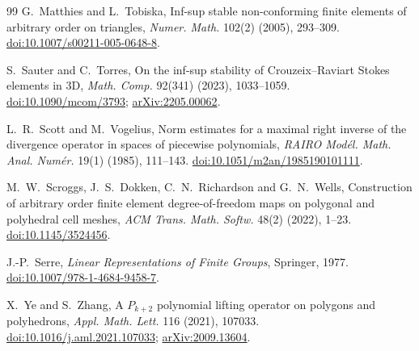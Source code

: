 \documentclass[11pt,a4paper]{article}
\theoremstyle{definition}
\theoremstyle{remark}
\begin{document}
\begin{thebibliography}{99}
 G.~Matthies and L.~Tobiska, Inf-sup stable non-conforming finite
elements of arbitrary order on triangles, \emph{Numer. Math.} 102(2) (2005),
293--309. \href{https://doi.org/10.1007/s00211-005-0648-8}{doi:10.1007/s00211-005-0648-8}.

 S.~Sauter and C.~Torres, On the inf-sup stability of
Crouzeix--Raviart Stokes elements in 3D, \emph{Math. Comp.} 92(341) (2023),
1033--1059. \href{https://doi.org/10.1090/mcom/3793}{doi:10.1090/mcom/3793};
\href{https://arxiv.org/abs/2205.00062}{arXiv:2205.00062}.

 L.~R.~Scott and M.~Vogelius, Norm estimates for a maximal right
inverse of the divergence operator in spaces of piecewise polynomials, \emph{RAIRO
Modél. Math. Anal. Numér.} 19(1) (1985), 111--143.
\href{https://doi.org/10.1051/m2an/1985190101111}{doi:10.1051/m2an/1985190101111}.

 M.~W.~Scroggs, J.~S.~Dokken, C.~N.~Richardson and G.~N.~Wells,
Construction of arbitrary order finite element degree-of-freedom maps on polygonal
and polyhedral cell meshes, \emph{ACM Trans. Math. Softw.} 48(2) (2022), 1--23.
\href{https://doi.org/10.1145/3524456}{doi:10.1145/3524456}.

 J.-P.~Serre, \emph{Linear Representations of Finite Groups},
Springer, 1977. \href{https://doi.org/10.1007/978-1-4684-9458-7}{doi:10.1007/978-1-4684-9458-7}.

 X.~Ye and S.~Zhang, A \(P_{k+2}\) polynomial lifting operator on
polygons and polyhedrons, \emph{Appl. Math. Lett.} 116 (2021), 107033.
\href{https://doi.org/10.1016/j.aml.2021.107033}{doi:10.1016/j.aml.2021.107033};
\href{https://arxiv.org/abs/2009.13604}{arXiv:2009.13604}.

\end{thebibliography}
\end{document}
